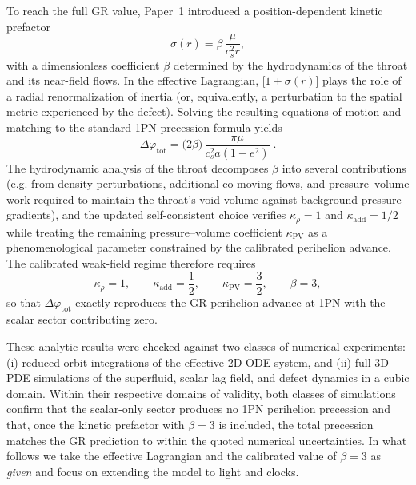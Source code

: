 \documentclass[11pt]{article}
\newcommand{\cS}{c_s}
\begin{document}
To reach the full GR value, Paper~1 introduced a position-dependent kinetic
prefactor
\begin{equation}
  \sigma(r) = \beta\,\frac{\mu}{\cS^2 r},
\end{equation}
with a dimensionless coefficient $\beta$ determined by the hydrodynamics of the
throat and its near-field flows.
In the effective Lagrangian, $\bigl[1+\sigma(r)\bigr]$ plays the role of a
radial renormalization of inertia (or, equivalently, a perturbation to the
spatial metric experienced by the defect).
Solving the resulting equations of motion and matching to the standard 1PN
precession formula yields
\begin{equation}
  \Delta\varphi_{\text{tot}}
  = \bigl(2\beta\bigr)\,
    \frac{\pi \mu}{\cS^2 a(1-e^2)} \;.
\end{equation}
The hydrodynamic analysis of the throat decomposes $\beta$ into several
contributions (e.g. from density perturbations, additional co-moving flows,
and pressure--volume work required to maintain the throat's void volume
against background pressure gradients), and the updated self-consistent choice
verifies $\kappa_\rho = 1$ and $\kappa_{\mathrm{add}} = 1/2$ while treating the
remaining pressure--volume coefficient $\kappa_{\mathrm{PV}}$ as a phenomenological
parameter constrained by the calibrated perihelion advance.  The calibrated
weak-field regime therefore requires
\begin{equation}
  \kappa_\rho = 1, \qquad
  \kappa_{\mathrm{add}} = \frac{1}{2}, \qquad
  \kappa_{\mathrm{PV}} = \frac{3}{2}, \qquad
  \beta = 3,
\end{equation}
so that $\Delta\varphi_{\text{tot}}$ exactly reproduces the GR perihelion
advance at 1PN with the scalar sector contributing zero.

These analytic results were checked against two classes of numerical experiments:
(i) reduced-orbit integrations of the effective 2D ODE system, and
(ii) full 3D PDE simulations of the superfluid, scalar lag field, and defect
dynamics in a cubic domain.
Within their respective domains of validity, both classes of simulations confirm
that the scalar-only sector produces no 1PN perihelion precession and that, once
the kinetic prefactor with $\beta = 3$ is included, the total precession matches
the GR prediction to within the quoted numerical uncertainties.
In what follows we take the effective Lagrangian and the calibrated value of
$\beta = 3$ as \emph{given} and focus on extending the model to light and clocks.
\end{document}
